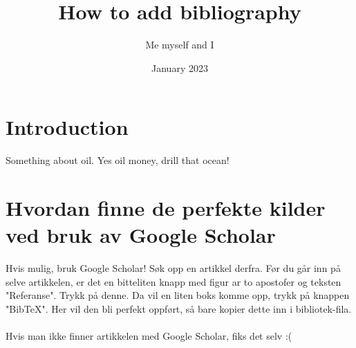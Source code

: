 \documentclass[12pt]{article}
\title{How to add bibliography}
\author{Me myself and I}
\date{January 2023}
\begin{document}
\maketitle

\section{Introduction}
Something about oil. Yes oil money, drill that ocean! \cite{barsky2004oil}

\section{Hvordan finne de perfekte kilder ved bruk av Google Scholar}
Hvis mulig, bruk Google Scholar! Søk opp en artikkel derfra. Før du går inn på selve artikkelen, er det en bitteliten knapp med figur ar to apostofer og teksten "Referanse". Trykk på denne.  Da vil en liten boks komme opp, trykk på knappen "BibTeX". Her vil den bli perfekt oppført, så bare kopier dette inn i bibliotek-fila. 
\\~\\
Hvis man ikke finner artikkelen med Google Scholar, fiks det selv :(
\newpage


\end{document}
